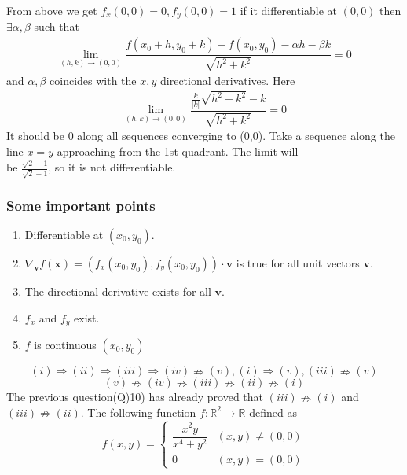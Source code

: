 \documentclass[11pt]{beamer}
\begin{document}
\begin{frame}
From above we get $f_x(0,0)=0,f_y(0,0)=1$ if it differentiable at $(0,0)$ then $\exists \alpha ,\beta$ such that
\begin{align*}
\underset{(h,k)\to(0,0)}{\lim} \dfrac{f(x_0+h,y_0+k)-f(x_0,y_0)-\alpha h-\beta k}{\sqrt{h^2+k^2}}=0
\end{align*}
and $\alpha,\beta$ coincides with the $x,y$ directional derivatives. Here
\begin{align*}
\underset{(h,k)\to(0,0)}{\lim} \dfrac{\frac{k}{|k|}\sqrt{h^2+k^2}-k}{\sqrt{h^2+k^2}}=0
\end{align*}
It should be 0 along all sequences converging to (0,0). Take a sequence along the line $x=y$ approaching from the 1st quadrant. The limit will \\be $\frac{\sqrt{2}-1}{\sqrt{2}-1}$, so it is not differentiable.
\end{frame}
\begin{frame}
\frametitle{Some important points}
\begin{enumerate}
  \item Differentiable at $(x_0,y_0)$.
  \item $\nabla_{\textbf{v}}f(\textbf{x})=(f_x(x_0,y_0),f_y(x_0,y_0))\cdot \textbf{v}$ is true for all unit vectors $\textbf{v}$.
  \item The directional derivative exists for all $\textbf{v}$.
  \item $f_x$ and $f_y$ exist.
  \item $f$ is continuous $(x_0,y_0)$
\end{enumerate}
$$(i)\Rightarrow (ii)\Rightarrow (iii)\Rightarrow (iv)\nRightarrow (v),(i)\Rightarrow (v),(iii)\nRightarrow (v)$$
$$(v)\nRightarrow (iv)\nRightarrow (iii)\nRightarrow (ii)\nRightarrow (i)$$
The previous question(Q)10) has already proved that $(iii)\nRightarrow (i)$ and $(iii)\nRightarrow (ii)$. The following function $f:\mathbb{R}^2\to\mathbb{R}$ defined as
\[f(x,y)= \begin{cases} 
      \dfrac{x^2y}{x^4+y^2} & (x,y)\neq (0,0) \\
      0 & (x,y)= (0,0)
   \end{cases}
\]
\end{frame}
\end{document}
